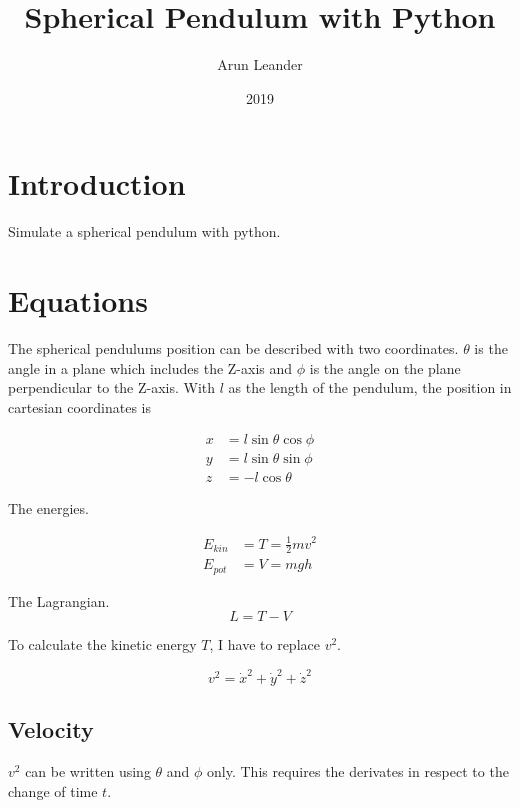 \documentclass{scrartcl}
\title{Spherical Pendulum with Python}
\author{Arun Leander}
\date{2019}
\begin{document}
\maketitle


\section{Introduction}

Simulate a spherical pendulum with python.

\section {Equations}

The spherical pendulums position can be described with two coordinates. $\theta$ is the angle in a plane which includes the Z-axis and $\phi$ is the angle on the plane perpendicular to the Z-axis. With $l$ as the length of the pendulum, the position in cartesian coordinates is

\begin{align}
x& = l \sin{\theta} \cos{\phi}                 \\
y& = l \sin{\theta} \sin{\phi}                 \\
z& = -l \cos{\theta}                                
\end{align}


The energies.

\begin{align}
E_{kin} &= T = \frac{1}{2} mv^2                 \\
E_{pot} &= V = mgh
\end{align}

The Lagrangian.
\begin{equation}
L = T - V
\end{equation}

To calculate the kinetic energy $T$, I have to replace $v^2$.

\begin{equation}
v^2 =   \dot{x}^2 + \dot{y}^2 + \dot{z}^2    
\end{equation}


\subsection{Velocity}
\label{ssec:velocity}

$v^2$ can be written using $\theta$ and $\phi$ only. This requires the derivates in respect to the change of time $t$.
\end{document}
